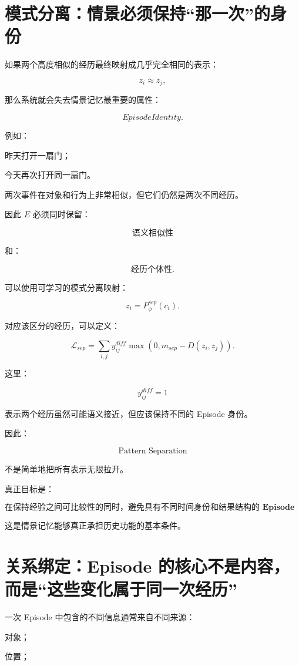 \section{模式分离：情景必须保持“那一次”的身份}

如果两个高度相似的经历最终映射成几乎完全相同的表示：

\[
z_i\approx z_j,
\]

那么系统就会失去情景记忆最重要的属性：

\[
\boxed{
EpisodeIdentity.
}
\]

例如：

昨天打开一扇门；

今天再次打开同一扇门。

两次事件在对象和行为上非常相似，但它们仍然是两次不同经历。

因此 \(E\) 必须同时保留：

\[
\boxed{
\text{语义相似性}
}
\]

和：

\[
\boxed{
\text{经历个体性}.
}
\]

可以使用可学习的模式分离映射：

\[
z_i
=
P_{\phi}^{sep}(c_i).
\]

对应该区分的经历，可以定义：

\[
\mathcal L_{sep}
=
\sum_{i,j}
y_{ij}^{diff}
\max
\left(
0,
m_{sep}-D(z_i,z_j)
\right).
\]

这里：

\[
y_{ij}^{diff}=1
\]

表示两个经历虽然可能语义接近，但应该保持不同的 Episode 身份。

因此：

\[
\boxed{
\text{Pattern Separation}
}
\]

不是简单地把所有表示无限拉开。

真正目标是：

\[
\boxed{
\textbf{
在保持经验之间可比较性的同时，避免具有不同时间身份和结果结构的 Episode 彼此覆盖。
}
}
\]

这是情景记忆能够真正承担历史功能的基本条件。


\section{关系绑定：Episode 的核心不是内容，而是“这些变化属于同一次经历”}

一次 Episode 中包含的不同信息通常来自不同来源：

对象；

位置；

